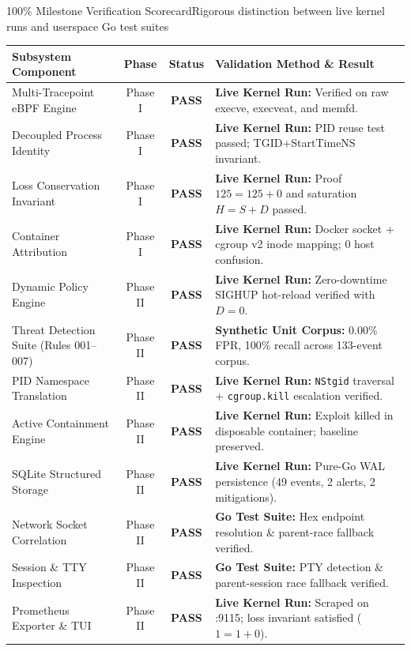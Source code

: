 \documentclass[aspectratio=169,10pt]{beamer}
\begin{document}
\begin{frame}{100\% Milestone Verification Scorecard}{Rigorous distinction between live kernel runs and userspace Go test suites}
  \scriptsize
  \begin{tabularx}{\textwidth}{l c c X}
    \toprule
    \textbf{Subsystem Component} & \textbf{Phase} & \textbf{Status} & \textbf{Validation Method \& Result} \\
    \midrule
    Multi-Tracepoint eBPF Engine & Phase I & \textcolor{emeraldDark}{\textbf{PASS}} & \textbf{Live Kernel Run:} Verified on raw execve, execveat, and memfd. \\
    Decoupled Process Identity & Phase I & \textcolor{emeraldDark}{\textbf{PASS}} & \textbf{Live Kernel Run:} PID reuse test passed; TGID+StartTimeNS invariant. \\
    Loss Conservation Invariant & Phase I & \textcolor{emeraldDark}{\textbf{PASS}} & \textbf{Live Kernel Run:} Proof $125=125+0$ and saturation $H=S+D$ passed. \\
    Container Attribution & Phase I & \textcolor{emeraldDark}{\textbf{PASS}} & \textbf{Live Kernel Run:} Docker socket + cgroup v2 inode mapping; 0 host confusion. \\
    Dynamic Policy Engine & Phase II & \textcolor{emeraldDark}{\textbf{PASS}} & \textbf{Live Kernel Run:} Zero-downtime SIGHUP hot-reload verified with $D=0$. \\
    Threat Detection Suite (Rules 001--007) & Phase II & \textcolor{emeraldDark}{\textbf{PASS}} & \textbf{Synthetic Unit Corpus:} 0.00\% FPR, 100\% recall across 133-event corpus. \\
    PID Namespace Translation & Phase II & \textcolor{emeraldDark}{\textbf{PASS}} & \textbf{Live Kernel Run:} \texttt{NStgid} traversal + \texttt{cgroup.kill} escalation verified. \\
    Active Containment Engine & Phase II & \textcolor{emeraldDark}{\textbf{PASS}} & \textbf{Live Kernel Run:} Exploit killed in disposable container; baseline preserved. \\
    SQLite Structured Storage & Phase II & \textcolor{emeraldDark}{\textbf{PASS}} & \textbf{Live Kernel Run:} Pure-Go WAL persistence (49 events, 2 alerts, 2 mitigations). \\
    Network Socket Correlation & Phase II & \textcolor{emeraldDark}{\textbf{PASS}} & \textbf{Go Test Suite:} Hex endpoint resolution \& parent-race fallback verified. \\
    Session \& TTY Inspection & Phase II & \textcolor{emeraldDark}{\textbf{PASS}} & \textbf{Go Test Suite:} PTY detection \& parent-session race fallback verified. \\
    Prometheus Exporter \& TUI & Phase II & \textcolor{emeraldDark}{\textbf{PASS}} & \textbf{Live Kernel Run:} Scraped on :9115; loss invariant satisfied ($1=1+0$). \\
    \bottomrule
  \end{tabularx}
\end{frame}
\end{document}
